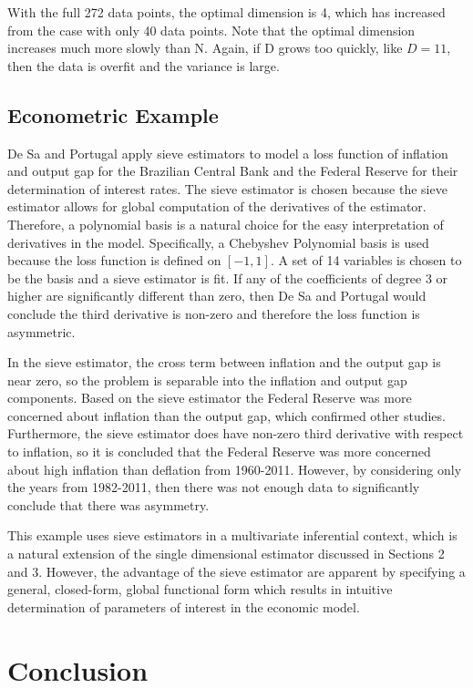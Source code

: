 \documentclass[12pt]{article}  %
\begin{document}
With the full 272 data points, the optimal dimension is 4, which has increased from the case with only 40 data points. Note that the optimal dimension increases much more slowly than N. Again, if D grows too quickly,  like $D = 11$, then the data is overfit and the variance is large. 


\subsection{Econometric Example}

De Sa and Portugal apply sieve estimators to model a loss function of inflation and output gap for the Brazilian Central Bank and the Federal Reserve for their determination of interest rates.  The sieve estimator is chosen because the sieve estimator allows for global computation of the derivatives of the estimator. Therefore, a polynomial basis is a natural choice for the easy interpretation of derivatives in the model. Specifically, a Chebyshev Polynomial basis is used because the loss function is defined on $[-1,1]$.  A set of 14 variables is chosen to be the basis and a sieve estimator is fit. If any of the coefficients of degree 3 or higher are significantly different than zero, then De Sa and Portugal would conclude the third derivative is non-zero and therefore the loss function is asymmetric. 

In the sieve estimator, the cross term between inflation and the output gap is near zero, so the problem is separable into the inflation and output gap components. Based on the sieve estimator the Federal Reserve was more concerned about inflation than the output gap, which confirmed other studies. Furthermore, the sieve estimator does have non-zero third derivative with respect to inflation, so it is concluded that the Federal Reserve was more concerned about high inflation than deflation from 1960-2011. However, by considering only the years from 1982-2011, then there was not enough data to significantly conclude that there was asymmetry.  

This example uses sieve estimators in a multivariate inferential context, which is a natural extension of the single dimensional estimator discussed in Sections 2 and 3. However, the advantage of the sieve estimator are apparent by specifying a general, closed-form, global functional form which results in intuitive determination of parameters of interest in the economic model. 


\section{Conclusion}
\end{document}
